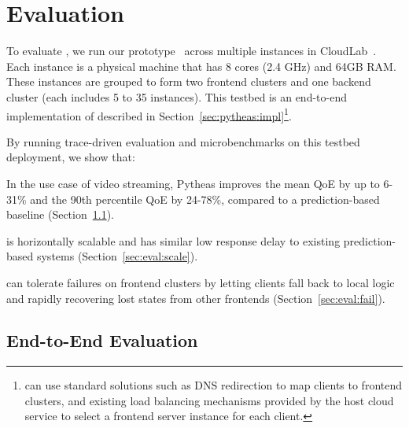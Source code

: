 \section{Evaluation}
\label{sec:pytheas:eval}


To evaluate \name, we run our prototype~\cite{ddn-source} across
multiple instances in CloudLab~\cite{cloudlab}.  Each instance is a physical
machine that has 8 cores (2.4 GHz) and 64GB RAM.  These instances are grouped 
 to form two frontend clusters and one backend
cluster (each includes 5 to 35 instances).  
This testbed is an end-to-end implementation of \name described in
Section~\ref{sec:pytheas:impl}\footnote{\name can use standard solutions such as DNS redirection
to map clients to frontend clusters, and existing load balancing mechanisms provided by the host
cloud service to select a frontend server instance for each client.}.


By running trace-driven evaluation and microbenchmarks on this testbed deployment, we show that:
\begin{packeditemize}
\item In the use case of video streaming, Pytheas improves the mean QoE by up to 6-31\% and the 90th percentile QoE by 24-78\%,
compared to a prediction-based baseline (Section~\ref{sec:eval:usecase}).  
\item \name is horizontally scalable and has similar low response delay to existing prediction-based systems  (Section~\ref{sec:eval:scale}).
\item \name can tolerate failures on frontend clusters by letting  clients fall back to local logic and rapidly recovering lost states from
 other frontends (Section~\ref{sec:eval:fail}).
\end{packeditemize}





\subsection{End-to-End Evaluation}
\label{sec:eval:usecase}

